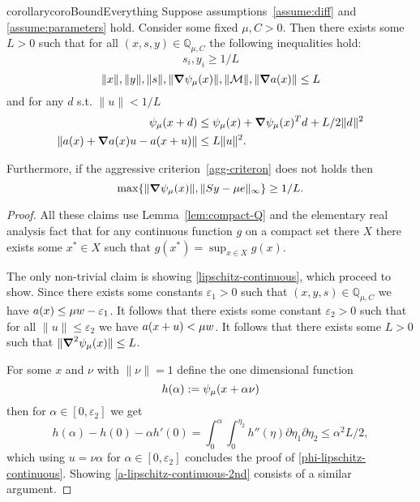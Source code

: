 \documentclass{article}
\begin{document}
\begin{restatable}{corollary}{coroBoundEverything}\label{coro:bound-everything}
Suppose assumptions~\ref{assume:diff} and \ref{assume:parameters} hold. Consider some fixed $\mu, C > 0$.
Then there exists some $L > 0$ such that for all $(x, s, y) \in \mathbb{Q}_{\mu, C}$ the following inequalities hold:
$$
s_i, y_i \ge 1/L
$$
$$
\| x \|, \| y \|, \| s \|, \| \grad \psi_{\mu}(x) \|, \| \mathcal{M} \|, \| \grad a(x) \| \le L
$$
and for any $d$ s.t. $\| u \| < 1 / L$
\begin{subequations}\label{lipschitz-continuous}
\begin{flalign}
\psi_{\mu}(x + d) &\le \psi_{\mu}(x) + \grad \psi_{\mu}(x)^T d_{}+ L / 2 \| d_{}\|^2 \label{phi-lipschitz-continuous} \\
\| a(x) + \grad a(x) u -a(x + u)  \| &\le L  \| u \|^2. \label{a-lipschitz-continuous-2nd}
\end{flalign}
\end{subequations}

Furthermore, if the aggressive criterion~\eqref{agg-criteron} does not holds then
$$
\max\{ \| \grad \psi_{\mu}(x) \|, \| S y - \mu e \|_{\infty} \} \ge 1 / L.
$$
\end{restatable}

\begin{proof}
All these claims use Lemma~\ref{lem:compact-Q} and the elementary real analysis fact that for any continuous function $g$ on a compact set there $X$ there exists some $x^{*} \in X$ such that $g(x^{*}) = \sup_{x \in X}{g(x)}$.

The only non-trivial claim is showing \eqref{lipschitz-continuous}, which proceed to show. Since there exists some constants $\varepsilon_{1} > 0$ such that $(x,y,s) \in \mathbb{Q}_{\mu, C}$ we have $a(x) \le \mu w - \varepsilon_{1}$. It follows that there exists some constant $\varepsilon_2 > 0$ such that for all $\| u \| \le \varepsilon_2$ we have $a(x + u) < \mu w$. It follows that there exists some $L > 0$ such that $\| \grad^2 \psi_{\mu}(x) \| \le L$.

For some $x$ and $\nu$ with $\| \nu \| = 1$ define the one dimensional function
$$
h(\alpha) :=  \psi_{\mu}(x + \alpha \nu) 
$$
then for $\alpha \in [0, \varepsilon_2]$ we get
$$
h(\alpha) - h(0) - \alpha h'(0) = \int_{0}^{\alpha}{ \int_{0}^{\eta_{2}}{h''(\eta) \partial \eta_{1} \partial \eta_{2}} } \le \alpha^2 L / 2,
$$
which using $u = \nu \alpha$ for $\alpha \in [0, \varepsilon_2]$ concludes the proof of \eqref{phi-lipschitz-continuous}. Showing \eqref{a-lipschitz-continuous-2nd} consists of a similar argument.
\end{proof}
\end{document}
